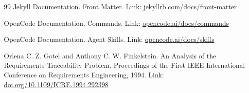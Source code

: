 \begin{thebibliography}{99}
Jekyll Documentation. Front Matter.
Link: \href{https://jekyllrb.com/docs/front-matter/}{jekyllrb.com/docs/front-matter}

OpenCode Documentation. Commands.
Link: \href{https://opencode.ai/docs/commands/}{opencode.ai/docs/commands}

OpenCode Documentation. Agent Skills.
Link: \href{https://opencode.ai/docs/skills/}{opencode.ai/docs/skills}

Orlena C. Z. Gotel and Anthony C. W. Finkelstein.
An Analysis of the Requirements Traceability Problem.
Proceedings of the First IEEE International Conference on Requirements Engineering, 1994.
Link: \href{https://doi.org/10.1109/ICRE.1994.292398}{doi.org/10.1109/ICRE.1994.292398}

\end{thebibliography}

